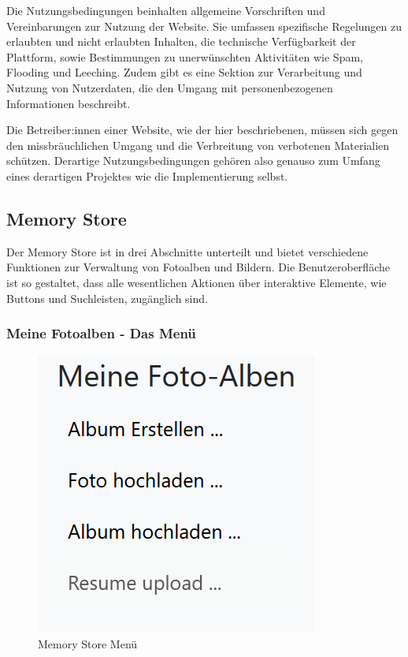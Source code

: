 Die Nutzungsbedingungen beinhalten allgemeine Vorschriften und Vereinbarungen zur Nutzung der Website. Sie umfassen spezifische Regelungen zu erlaubten und nicht erlaubten Inhalten, die technische Verfügbarkeit der Plattform, sowie Bestimmungen zu unerwünschten Aktivitäten wie Spam, Flooding und Leeching. Zudem gibt es eine Sektion zur Verarbeitung und Nutzung von Nutzerdaten, die den Umgang mit personenbezogenen Informationen beschreibt.

Die Betreiber:innen einer Website, wie der hier beschriebenen, müssen sich gegen den missbräuchlichen Umgang und die Verbreitung von verbotenen Materialien schützen. Derartige Nutzungsbedingungen gehören also genauso zum Umfang eines derartigen Projektes wie die Implementierung selbst.






\subsection{Memory Store}

Der Memory Store ist in drei Abschnitte unterteilt und bietet verschiedene Funktionen zur Verwaltung von Fotoalben und Bildern. Die Benutzeroberfläche ist so gestaltet, dass alle wesentlichen Aktionen über interaktive Elemente, wie Buttons und Suchleisten, zugänglich sind.

\subsubsection{Meine Fotoalben - Das Menü}

\begin{figure}
    \centering
    \includegraphics[scale=0.8]{pics/memory_store_menu.PNG}
    \caption{Memory Store Menü}
    \label{fig:memory-store-menu}
\end{figure}


